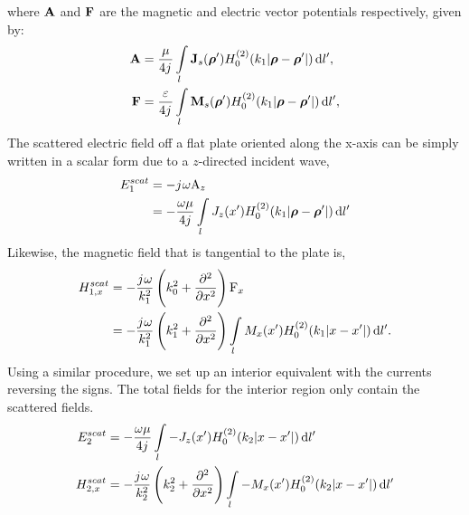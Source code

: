 %
where $\mathbf{A}$ and $\mathbf{F}$ are the magnetic and electric vector potentials respectively, given by:
%
\begin{subequations}
  \begin{align}
    \mathbf{A} &=  \frac{\mu}{4 {j}\mkern1mu} \int\limits_{l} \mathbf{J}_s(\boldsymbol {\rho}') H_0^{(2)}(k_1 |\boldsymbol {\rho} - \boldsymbol {\rho}'|) \mathop{}\!\mathrm{d}{l'},
    \label{eq:A_thin}\\
    \mathbf{F} &=  \frac{\varepsilon}{4 {j}\mkern1mu} \int\limits_{l} \mathbf{M}_s(\boldsymbol {\rho}') H_0^{(2)}(k_1 |\boldsymbol {\rho} - \boldsymbol {\rho}'|) \mathop{}\!\mathrm{d}{l'},
    \label{eq:Fig}
  \end{align}
  \label{eq:potentials_2d}%
\end{subequations}%
%
The scattered electric field off a flat plate oriented along the x-axis can be simply written in a scalar form due to a $z$-directed incident wave,
%
\begin{equation}
  \begin{split}
    E_1^{scat} &= -{j}\mkern1mu \omega \mathrm A_z \\
    &= - \frac{\omega \mu}{4 j} \int\limits_{l} J_z(x')  H_0^{(2)}(k_1 |\boldsymbol {\rho} - \boldsymbol {\rho}'|) \mathop{}\!\mathrm{d}{l'}
    \label{eq:E1sc_scalar}
  \end{split}
\end{equation}
%
Likewise, the magnetic field that is tangential to the plate is,
%
\begin{equation}
  \begin{split}
    H_{1,x}^{scat} &= -\frac{{j}\mkern1mu \omega}{k_1^2}\left(k_0^2 +  \pdv[2]{}{x} \right) \mathrm F_x \\
    &= -\frac{{j}\mkern1mu \omega}{k_1^2}\left(k_1^2 +  \pdv[2]{}{x} \right) \int\limits_{l} M_x(x') H_0^{(2)}(k_1 |x - x'|) \mathop{}\!\mathrm{d}{l'}.
  \end{split}
  \label{eq:H1sc_scalar}
\end{equation}
%
Using a similar procedure, we set up an interior equivalent with the currents reversing the signs. The total fields for the interior region only contain the scattered fields.
%
\begin{subequations}
  \begin{align}
    E_2^{scat} &= -\frac{\omega \mu}{4 {j}\mkern1mu} \int\limits_{l} -J_z(x')  H_0^{(2)}(k_2 |x - x'|) \mathop{}\!\mathrm{d}{l'}
    \label{eq:E2sc}\\
    H_{2,x}^{scat} &= - \frac{{j}\mkern1mu \omega}{k_2^2}\left(k_2^2 +  \pdv[2]{}{x} \right) \int\limits_{l} -M_x(x') H_0^{(2)}(k_2 |x - x'|) \mathop{}\!\mathrm{d}{l'}
    \label{eq:H2sc}
  \end{align}
  \label{eq:2sc}%
\end{subequations}%


